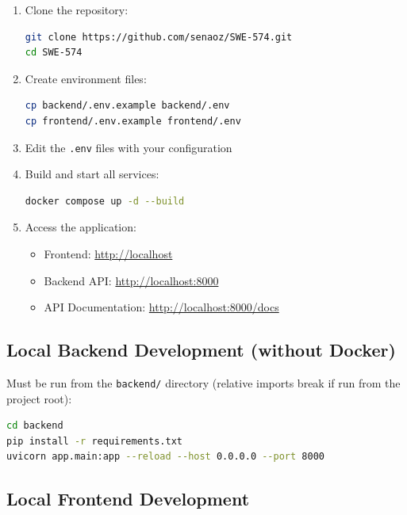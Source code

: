 \documentclass[10pt,a4paper]{report}
\begin{document}
\begin{enumerate}
    \item Clone the repository:
          \begin{lstlisting}[language=bash]
git clone https://github.com/senaoz/SWE-574.git
cd SWE-574
    \end{lstlisting}

    \item Create environment files:
          \begin{lstlisting}[language=bash]
cp backend/.env.example backend/.env
cp frontend/.env.example frontend/.env
    \end{lstlisting}

    \item Edit the \texttt{.env} files with your configuration

    \item Build and start all services:
          \begin{lstlisting}[language=bash]
docker compose up -d --build
    \end{lstlisting}

    \item Access the application:
          \begin{itemize}
              \item Frontend: \url{http://localhost}
              \item Backend API: \url{http://localhost:8000}
              \item API Documentation: \url{http://localhost:8000/docs}
          \end{itemize}
\end{enumerate}

\subsection{Local Backend Development (without Docker)}

Must be run from the \texttt{backend/} directory (relative imports break if run from the project root):

\begin{lstlisting}[language=bash]
cd backend
pip install -r requirements.txt
uvicorn app.main:app --reload --host 0.0.0.0 --port 8000
\end{lstlisting}

\subsection{Local Frontend Development}
\end{document}

